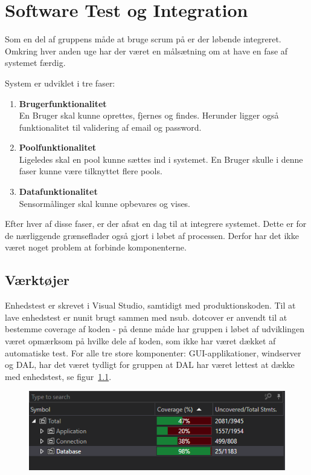 \chapter{Software Test og Integration}

Som en del af gruppens måde at bruge scrum på er der løbende integreret. Omkring hver anden uge har der været en målsætning om at have en fase af systemet færdig. 

System er udviklet i tre faser: 

\begin{enumerate}
	\item \textbf{Brugerfunktionalitet}\\
	En Bruger skal kunne oprettes, fjernes og findes. Herunder ligger også funktionalitet til validering af email og password. 
	\item \textbf{Poolfunktionalitet}\\
	Ligeledes skal en pool kunne sættes ind i systemet. En Bruger skulle i denne faser kunne være tilknyttet flere pools.
	\item \textbf{Datafunktionalitet}\\
	Sensormålinger skal kunne opbevares og vises. 
\end{enumerate}

Efter hver af disse faser, er der afsat en dag til at integrere systemet. Dette er for de nærliggende grænseflader også gjort i løbet af processen. Derfor har det ikke været noget problem at forbinde komponenterne. 

\section{Værktøjer}
Enhedstest er skrevet i Visual Studio, samtidigt med produktionskoden. Til at lave enhedstest er \gls{nunit} brugt sammen med \gls{nsub}. 
\gls{dotcover} er anvendt til at bestemme coverage af koden - på denne måde har gruppen i løbet af udviklingen været opmærksom på hvilke dele af koden, som ikke har været dækket af automatiske test.
For alle tre store komponenter: GUI-applikationer, \gls{windserver} og DAL, har det været tydligt for gruppen at DAL har været lettest at dække med enhedstest, se figur~\ref{fig:coverage}.

\begin{figure}
\centering
\includegraphics[width=0.7\linewidth]{figs/test/coverage}
\caption{}
\label{fig:coverage}
\end{figure}


